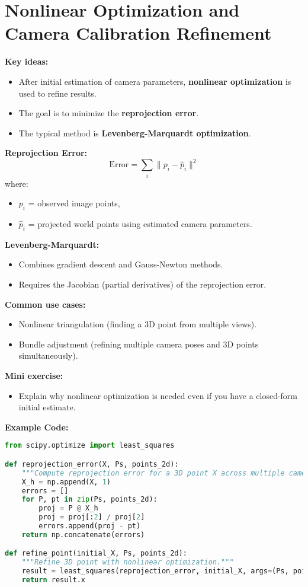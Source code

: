 \documentclass[a4paper,11pt]{article}
\begin{document}
\newpage
\section{Nonlinear Optimization and Camera Calibration Refinement}

\textbf{Key ideas:}
\begin{itemize}
    \item After initial estimation of camera parameters, \textbf{nonlinear optimization} is used to refine results.
    \item The goal is to minimize the \textbf{reprojection error}.
    \item The typical method is \textbf{Levenberg-Marquardt optimization}.
\end{itemize}

\textbf{Reprojection Error:}
\[
\text{Error} = \sum_i \| p_i - \hat{p}_i \|^2
\]
where:
\begin{itemize}
    \item $p_i$ = observed image points,
    \item $\hat{p}_i$ = projected world points using estimated camera parameters.
\end{itemize}

\textbf{Levenberg-Marquardt:}
\begin{itemize}
    \item Combines gradient descent and Gauss-Newton methods.
    \item Requires the Jacobian (partial derivatives) of the reprojection error.
\end{itemize}

\textbf{Common use cases:}
\begin{itemize}
    \item Nonlinear triangulation (finding a 3D point from multiple views).
    \item Bundle adjustment (refining multiple camera poses and 3D points simultaneously).
\end{itemize}

\textbf{Mini exercise:}
\begin{itemize}
    \item Explain why nonlinear optimization is needed even if you have a closed-form initial estimate.
\end{itemize}

\vspace{1em}

\textbf{Example Code:}
\begin{lstlisting}[language=Python]
from scipy.optimize import least_squares

def reprojection_error(X, Ps, points_2d):
    """Compute reprojection error for a 3D point X across multiple cameras."""
    X_h = np.append(X, 1)
    errors = []
    for P, pt in zip(Ps, points_2d):
        proj = P @ X_h
        proj = proj[:2] / proj[2]
        errors.append(proj - pt)
    return np.concatenate(errors)

def refine_point(initial_X, Ps, points_2d):
    """Refine 3D point with nonlinear optimization."""
    result = least_squares(reprojection_error, initial_X, args=(Ps, points_2d))
    return result.x
\end{lstlisting}
\end{document}
